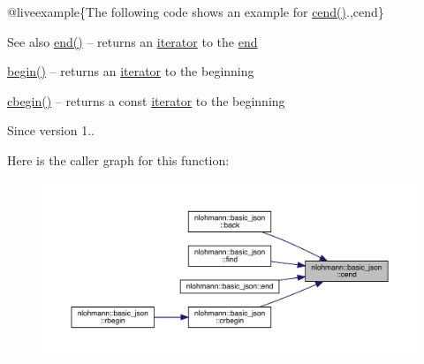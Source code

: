 @liveexample\{The following code shows an example for {\ttfamily \mbox{\hyperlink{classnlohmann_1_1basic__json_a8dba7b7d2f38e6b0c614030aa43983f6}{cend()}}}.,cend\}

\begin{DoxySeeAlso}{See also}
\mbox{\hyperlink{classnlohmann_1_1basic__json_a13e032a02a7fd8a93fdddc2fcbc4763c}{end()}} -- returns an \mbox{\hyperlink{classnlohmann_1_1basic__json_a099316232c76c034030a38faa6e34dca}{iterator}} to the \mbox{\hyperlink{classnlohmann_1_1basic__json_a13e032a02a7fd8a93fdddc2fcbc4763c}{end}} 

\mbox{\hyperlink{classnlohmann_1_1basic__json_a0ff28dac23f2bdecee9564d07f51dcdc}{begin()}} -- returns an \mbox{\hyperlink{classnlohmann_1_1basic__json_a099316232c76c034030a38faa6e34dca}{iterator}} to the beginning 

\mbox{\hyperlink{classnlohmann_1_1basic__json_ad865d6c291b237ae508d5cb2146b5877}{cbegin()}} -- returns a const \mbox{\hyperlink{classnlohmann_1_1basic__json_a099316232c76c034030a38faa6e34dca}{iterator}} to the beginning
\end{DoxySeeAlso}
\begin{DoxySince}{Since}
version 1.. 
\end{DoxySince}
Here is the caller graph for this function\+:\nopagebreak
\begin{figure}[H]
\begin{center}
\leavevmode
\includegraphics[width=350pt]{classnlohmann_1_1basic__json_a8dba7b7d2f38e6b0c614030aa43983f6_icgraph}
\end{center}
\end{figure}
\mbox{\label{classnlohmann_1_1basic__json_abfeba47810ca72f2176419942c4e1952}} 
